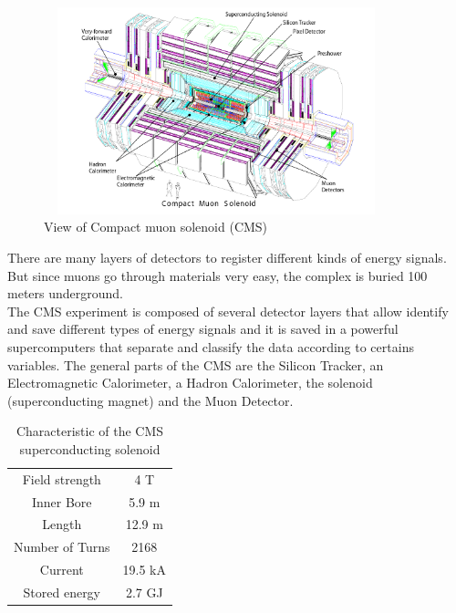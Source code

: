 \begin{figure}[!htbp]
	\centering
	\includegraphics[width=10cm,height=6cm]{Chapter2/cms2.png}
	\caption{View of Compact muon solenoid (CMS)\cite{cms-manual}}\label{cms}
\end{figure}
There are many layers of detectors to register different kinds of energy signals. But since muons go through materials very easy, the complex is buried 100 meters underground.\\ 

The CMS experiment is composed of several detector layers that allow identify and save different types of energy signals and it is saved in a powerful supercomputers that separate and classify the data according to certains variables. The general parts of the CMS are the Silicon Tracker, an Electromagnetic Calorimeter, a Hadron Calorimeter, the solenoid (superconducting magnet) and the Muon Detector. \\

\begin{table}[ht]
	\caption{Characteristic of the CMS superconducting solenoid\cite{cms-manual}}
	\centering
	\begin{tabular}{|c|c|}
		\hline
		Field strength & 4 T \\
		Inner Bore & 5.9 m \\
		Length & 12.9 m\\
		Number of Turns & 2168\\
		Current & 19.5 kA\\
		Stored energy & 2.7 GJ\\
		\hline
	\end{tabular}
	\label{tab:my_label}
\end{table}




